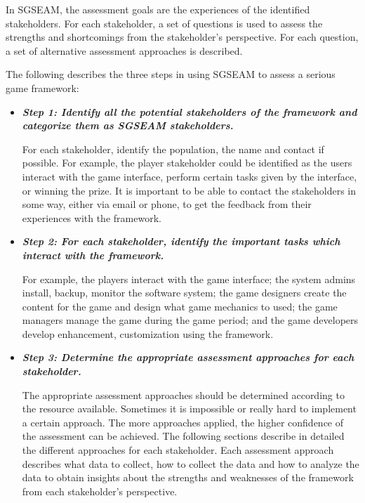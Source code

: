 In SGSEAM, the assessment goals are the experiences of the identified stakeholders. For each
stakeholder, a set of questions is used to assess the strengths and shortcomings from the
stakeholder's perspective. For each question, a set of alternative assessment approaches is
described.

The following describes the three steps in using SGSEAM to assess a serious game framework:

\begin{itemize}
\item \textbf{\emph{Step 1: Identify all the potential stakeholders of the framework and categorize them as SGSEAM stakeholders.}}

For each stakeholder, identify the population, the name and contact if possible. For example, the 
player stakeholder could be identified as the users interact with the game interface, perform certain tasks given by the interface, or winning the prize. It is important to be able to contact the stakeholders in some way, either via email or phone, to get the feedback from their experiences with the framework.


\item \textbf{\emph{Step 2: For each stakeholder, identify the important tasks which interact with the framework.}}
    
For example, the players interact with the game interface; the system admins install, backup, monitor the software system; the game designers create the content for the game and design what game mechanics to used; the game managers manage the game during the game period; and the game developers develop enhancement, customization using the framework.

\item \textbf{\emph{Step 3: Determine the appropriate assessment approaches for each stakeholder.}}

The appropriate assessment approaches should be determined according to the resource available. Sometimes it is impossible or really hard to implement a certain approach. The more approaches applied, the higher confidence of the assessment can be achieved. The following sections describe in detailed the different approaches for each stakeholder.  Each assessment approach describes what data to collect, how to collect the data and how to analyze the data to obtain insights about the strengths and weaknesses of the framework from each stakeholder's perspective.

\end{itemize}


